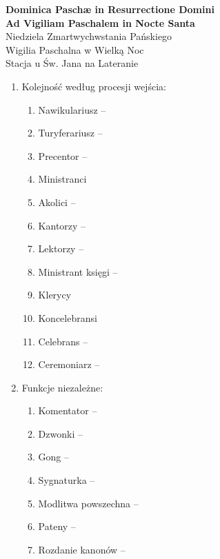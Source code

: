 \documentclass[10pt,oneside,final,notitlepage,a4paper,wide]{mwart}
\begin{document}
%
\begin{center}
	\LARGE{\textbf{Dominica Paschæ in Resurrectione Domini\\Ad Vigiliam Paschalem in Nocte Santa}}\\ \smallskip
	\small{Niedziela Zmartwychwstania Pańskiego\\Wigilia Paschalna w Wielką Noc\\ \smallskip Stacja u Św. Jana na Lateranie}
\end{center} \vspace{1cm}

\begin{enumerate}
	\item Kolejność według procesji wejścia:
	\begin{enumerate}
		\item Nawikulariusz -- 
		\item Turyferariusz --
		\item Precentor --
		\item Ministranci
		\item Akolici --
		\item Kantorzy -- 
		\item Lektorzy --  
		\item Ministrant księgi --
		\item Klerycy
		\item Koncelebransi
		\item Celebrans -- 
		\item Ceremoniarz -- 
\smallskip
	\end{enumerate}
	\item Funkcje niezależne:
	\begin{enumerate}
		\item Komentator --
		\item Dzwonki -- 
		\item Gong -- 
		\item Sygnaturka -- 
		\item Modlitwa powszechna -- 
		\item Pateny --
		\item Rozdanie kanonów --
	\end{enumerate}
\end{enumerate}
\end{document}
